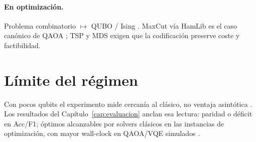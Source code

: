 \paragraph{En optimización.}
Problema combinatorio $\mapsto$ QUBO / Ising \citep{lucas2014}. MaxCut vía HamLib es el caso canónico de QAOA \citep{sawaya2024hamlib, pennylaneHamlibMaxcut, pennylaneQaoaMaxcut}; TSP y MDS exigen que la codificación preserve coste y factibilidad.

\section{Límite del régimen}

Con pocos qubits el experimento mide cercanía al clásico, no ventaja asintótica \citep{preskill2018, thanasilp2022}. Los resultados del Capítulo~\ref{cap:evaluacion} anclan esa lectura: paridad o déficit en Acc/F1; óptimos alcanzables por solvers clásicos en las instancias de optimización, con mayor wall-clock en QAOA/VQE simulados \citep{bowles2024, lubinski2024}.
